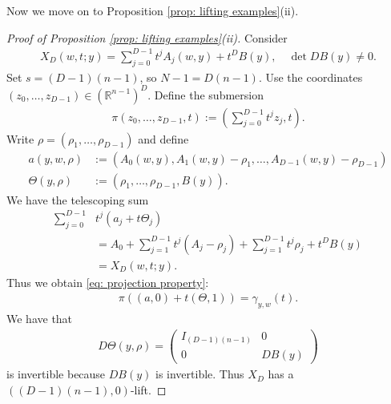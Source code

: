 \documentclass[reqno,11pt]{amsart}
\numberwithin{equation}{section}
\numberwithin{figure}{section}
\def\R{\mathbb{R}}
\theoremstyle{plain}
\theoremstyle{definition}
\begin{document}
    Now we move on to Proposition \ref{prop: lifting examples}(ii).
    \begin{proof}[Proof of Proposition \ref{prop: lifting examples}(ii)]
        Consider 
        \begin{align}
            X_D(w,t;y) = \sum_{j=0}^{D-1} t^j A_j(w,y) + t^D B(y), \quad \det DB(y) \neq 0.
        \end{align}
        Set $s = (D-1)(n-1)$, so $N-1=D(n-1)$. Use the coordinates $(z_0,\ldots, z_{D-1}) \in (\R^{n-1})^D$. Define the submersion 
        \begin{align}
            \pi(z_0,\ldots, z_{D-1},t) := (\sum_{j=0}^{D-1} t^j z_j, t).
        \end{align}
        Write $\rho = (\rho_1,\ldots, \rho_{D-1})$ and define 
        \begin{align}
            a(y,w,\rho) &:= (A_0(w,y), A_1 (w,y)-\rho_1, \ldots, A_{D-1}(w,y)-\rho_{D-1}) \\
            \Theta(y,\rho) &:= (\rho_1,\ldots, \rho_{D-1}, B(y)).
        \end{align}
        We have the telescoping sum 
        \begin{align}
            \sum_{j=0}^{D-1} &t^j (a_j + t\Theta_j) \\
            &= A_0 + \sum_{j=1}^{D-1} t^j (A_j - \rho_j) + \sum_{j=1}^{D-1} t^j \rho_j + t^D B(y) \\
            &= X_D(w,t;y).
        \end{align}
        Thus we obtain \eqref{eq: projection property}:
        \begin{align}
            \pi((a,0)+t(\Theta,1)) = \gamma_{y,w}(t).
        \end{align}
        We have that 
        \begin{align}
            D\Theta(y,\rho) = 
            \begin{pmatrix}
                I_{(D-1)(n-1)} & 0 \\
                0 & DB(y)
            \end{pmatrix}
        \end{align}
        is invertible because $DB(y)$ is invertible. Thus $X_D$ has a $((D-1)(n-1), 0)$-lift.
    \end{proof}
\end{document}
